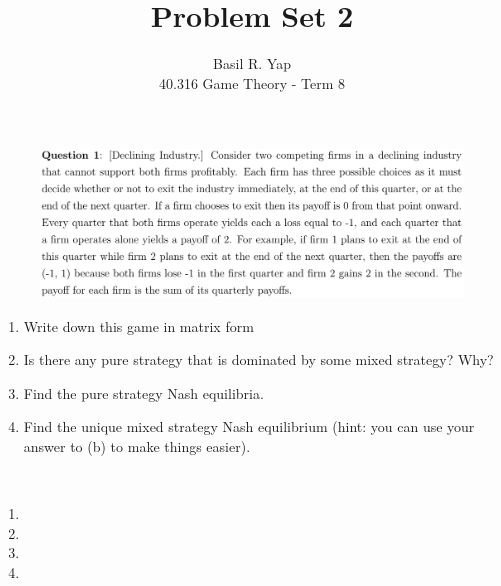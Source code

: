 \documentclass[12pt]{article}
\newenvironment{solution}[2][Solution]{\begin{trivlist}
\item[\hskip \labelsep {\bfseries #1}]}{\end{trivlist}}
\begin{document}
 
 
\title{Problem Set 2}%
\author{Basil R. Yap\\ %
40.316 Game Theory - Term 8} %
 
\maketitle

\begin{figure}[h!]
\includegraphics[width=\linewidth]{./assets/201806021724.png}
\end{figure}
\begin{enumerate}[label=(\alph*)]
\item Write down this game in matrix form
\item Is there any pure strategy that is dominated by some mixed strategy? Why?
\item Find the pure strategy Nash equilibria.
\item Find the unique mixed strategy Nash equilibrium (hint: you can use your answer to (b) to make things easier).
\end{enumerate}

\begin{solution}{}~\\
\begin{enumerate}[label=(\alph*)]
\item
\item 
\item 
\item 
\end{enumerate}
\end{solution}
\end{document}
